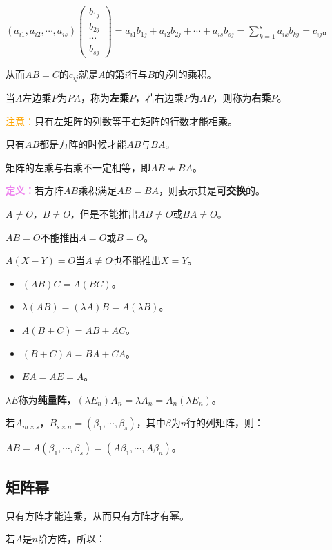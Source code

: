 \documentclass[UTF8, 12pt]{ctexart}
\begin{document}
$(a_{i1},a_{i2},\cdots,a_{is})\left(
    \begin{array}{c}
        b_{1j} \\
        b_{2j} \\
        \cdots \\
        b_{sj}
    \end{array}
\right)=a_{i1}b_{1j}+a_{i2}b_{2j}+\cdots+a_{is}b_{sj}=\sum\limits_{k=1}^sa_{ik}b_{kj}=c_{ij}$。\medskip

从而$AB=C$的$c_{ij}$就是$A$的第$i$行与$B$的$j$列的乘积。

当$A$左边乘$P$为$PA$，称为\textbf{左乘}$P$，若右边乘$P$为$AP$，则称为\textbf{右乘}$P$。

\textcolor{orange}{注意：}只有左矩阵的列数等于右矩阵的行数才能相乘。

只有$AB$都是方阵的时候才能$AB$与$BA$。

矩阵的左乘与右乘不一定相等，即$AB\neq BA$。

\textcolor{violet}{\textbf{定义：}}若方阵$AB$乘积满足$AB=BA$，则表示其是\textbf{可交换}的。

$A\neq O$，$B\neq O$，但是不能推出$AB\neq O$或$BA\neq O$。

$AB=O$不能推出$A=O$或$B=O$。

$A(X-Y)=O$当$A\neq O$也不能推出$X=Y$。

\begin{itemize}
    \item $(AB)C=A(BC)$。
    \item $\lambda(AB)=(\lambda A)B=A(\lambda B)$。
    \item $A(B+C)=AB+AC$。
    \item $(B+C)A=BA+CA$。
    \item $EA=AE=A$。
\end{itemize}

$\lambda E$称为\textbf{纯量阵}，$(\lambda E_n)A_n=\lambda A_n=A_n(\lambda E_n)$。

若$A_{m\times s}$，$B_{s\times n}=(\beta_1,\cdots,\beta_s)$，其中$\beta$为$n$行的列矩阵，则：

$AB=A(\beta_1,\cdots,\beta_s)=(A\beta_1,\cdots,A\beta_n)$。

\subsection{矩阵幂}

只有方阵才能连乘，从而只有方阵才有幂。

若$A$是$n$阶方阵，所以：
\end{document}
